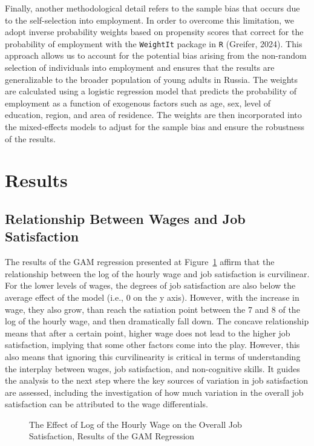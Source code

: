 \documentclass[
]{interact}
\begin{document}
Finally, another methodological detail refers to the sample bias that
occurs due to the self-selection into employment. In order to overcome
this limitation, we adopt inverse probability weights based on
propensity scores that correct for the probability of employment with
the \texttt{WeightIt} package in \texttt{R} (Greifer, 2024). This
approach allows us to account for the potential bias arising from the
non-random selection of individuals into employment and ensures that the
results are generalizable to the broader population of young adults in
Russia. The weights are calculated using a logistic regression model
that predicts the probability of employment as a function of exogenous
factors such as age, sex, level of education, region, and area of
residence. The weights are then incorporated into the mixed-effects
models to adjust for the sample bias and ensure the robustness of the
results.

\section{Results}\label{results}

\subsection{Relationship Between Wages and Job
Satisfaction}\label{relationship-between-wages-and-job-satisfaction}

The results of the GAM regression presented at
Figure~\ref{fig-wage-jobsatisf} affirm that the relationship between the
log of the hourly wage and job satisfaction is curvilinear. For the
lower levels of wages, the degrees of job satisfaction are also below
the average effect of the model (i.e., 0 on the y axis). However, with
the increase in wage, they also grow, than reach the satiation point
between the 7 and 8 of the log of the hourly wage, and then dramatically
fall down. The concave relationship means that after a certain point,
higher wage does not lead to the higher job satisfaction, implying that
some other factors come into the play. However, this also means that
ignoring this curvilinearity is critical in terms of understanding the
interplay between wages, job satisfaction, and non-cognitive skills. It
guides the analysis to the next step where the key sources of variation
in job satisfaction are assessed, including the investigation of how
much variation in the overall job satisfaction can be attributed to the
wage differentials.

\begin{figure}


\caption{\label{fig-wage-jobsatisf}The Effect of Log of the Hourly Wage
on the Overall Job Satisfaction, Results of the GAM Regression}

\end{figure}%
\end{document}
